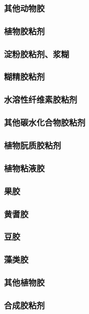 \documentclass[UTF8]{../../ApplicationUniverse}
\begin{document}
    \subsubsection{其他动物胶}
\subsubsection{植物胶粘剂}
    \subsubsection{淀粉胶粘剂、浆糊}
    \subsubsection{糊精胶粘剂}
    \subsubsection{水溶性纤维素胶粘剂}
    \subsubsection{其他碳水化合物胶粘剂}
    \subsubsection{植物朊质胶粘剂}
    \subsubsection{植物粘液胶}
        \subsubsection{果胶}
        \subsubsection{黄耆胶}
        \subsubsection{豆胶}
        \subsubsection{藻类胶}
    \subsubsection{其他植物胶}
\subsubsection{合成胶粘剂}
\end{document}
